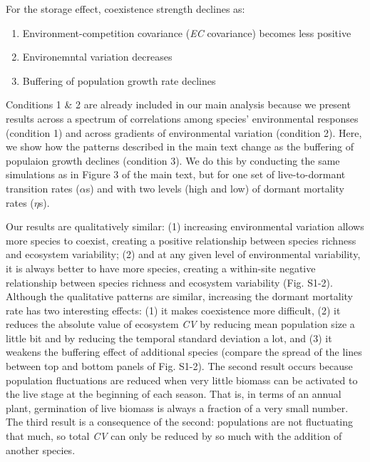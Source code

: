 \documentclass[11pt,]{article}
\providecommand{\tightlist}{%
  \setlength{\itemsep}{0pt}\setlength{\parskip}{0pt}}
\begin{document}
For the storage effect, coexistence strength declines as:

\begin{enumerate}
\def\labelenumi{\arabic{enumi}.}
\tightlist
\item
  Environment-competition covariance (\emph{EC} covariance) becomes less
  positive
\item
  Environemntal variation decreases
\item
  Buffering of population growth rate declines
\end{enumerate}

Conditions 1 \& 2 are already included in our main analysis because we
present results across a spectrum of correlations among species'
environmental responses (condition 1) and across gradients of
environmental variation (condition 2). Here, we show how the patterns
described in the main text change as the buffering of populaion growth
declines (condition 3). We do this by conducting the same simulations as
in Figure 3 of the main text, but for one set of live-to-dormant
transition rates (\(\alpha\)s) and with two levels (high and low) of
dormant mortality rates (\(\eta\)s).

Our results are qualitatively similar: (1) increasing environmental
variation allows more species to coexist, creating a positive
relationship between species richness and ecosystem variability; (2) and
at any given level of environmental variability, it is always better to
have more species, creating a within-site negative relationship between
species richness and ecosystem variability (Fig. S1-2). Although the
qualitative patterns are similar, increasing the dormant mortality rate
has two interesting effects: (1) it makes coexistence more difficult,
(2) it reduces the absolute value of ecosystem \emph{CV} by reducing
mean population size a little bit and by reducing the temporal standard
deviation a lot, and (3) it weakens the buffering effect of additional
species (compare the spread of the lines between top and bottom panels
of Fig. S1-2). The second result occurs because population fluctuations
are reduced when very little biomass can be activated to the live stage
at the beginning of each season. That is, in terms of an annual plant,
germination of live biomass is always a fraction of a very small number.
The third result is a consequence of the second: populations are not
fluctuating that much, so total \emph{CV} can only be reduced by so much
with the addition of another species.
\end{document}
